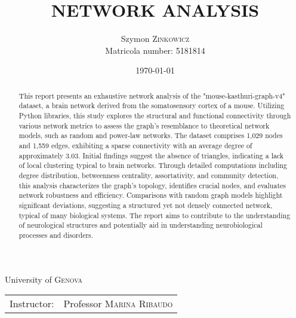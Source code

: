 \documentclass[
	report, %
	11pt, %
]{CSUniSchoolLabReport}
\title{NETWORK ANALYSIS} %
\author{Szymon \textsc{Zinkowicz} \\ Matricola number: 5181814} %
\date{\today} %
\begin{document}
\maketitle %
\thispagestyle{empty}

\begin{center}
	\vspace{\fill}
	University of \textsc{Genova} \\
	\begin{tabular}{l r}
		Instructor: & Professor \textsc{Marina Ribaudo}
	\end{tabular}
\end{center}
\pagebreak



\begin{abstract}
	\thispagestyle{empty}
	This report presents an exhaustive network analysis of the "mouse-kasthuri-graph-v4" dataset, a brain network derived from the somatosensory cortex of a mouse. Utilizing Python libraries, this study explores the structural and functional connectivity through various network metrics to assess the graph's resemblance to theoretical network models, such as random and power-law networks. The dataset comprises 1,029 nodes and 1,559 edges, exhibiting a sparse connectivity with an average degree of approximately 3.03. Initial findings suggest the absence of triangles, indicating a lack of local clustering typical to brain networks. Through detailed computations including degree distribution, betweenness centrality, assortativity, and community detection, this analysis characterizes the graph's topology, identifies crucial nodes, and evaluates network robustness and efficiency. Comparisons with random graph models highlight significant deviations, suggesting a structured yet not densely connected network, typical of many biological systems. The report aims to contribute to the understanding of neurological structures and potentially aid in understanding neurobiological processes and disorders.\\
	
\end{abstract}
\pagebreak

\tableofcontents %
\thispagestyle{empty}
\pagebreak
\end{document}
